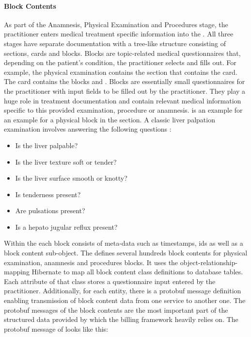 \paragraph{Block Contents}
As part of the Anamnesis, Physical Examination and Procedures stage,
the practitioner enters medical treatment specific information into the \AVS.
All three stages have separate documentation with a tree-like structure consisting of sections, cards and blocks.
Blocks are topic-related medical questionnaires that, depending on the patient's condition, the practitioner selects and fills out.
For example, the physical examination contains the section  that contains the  card.
The  card contains the blocks  and .
Blocks are essentially small questionnaires for the practitioner with input fields to be filled out by the practitioner.
They play a huge role in treatment documentation and contain relevant medical information specific to this provided examination, procedure or anamnesis.
 is an example for an example for a physical block in the  section.
A classic liver palpation examination involves answering the following questions \cite{wolf1990evaluation}:
\begin{itemize}
    \item Is the liver palpable?
    \item Is the liver texture soft or tender?
    \item Is the liver surface smooth or knotty?
    \item Is tenderness present?
    \item Are pulsations present?
    \item Is a hepato jugular reflux present?
\end{itemize}
Within the \AVS each block consists of meta-data such as timestamps, ids as well as a block content sub-object.
The \AVS defines several hundreds block contents for physical examination, anamnesis and procedures blocks.
It uses the object-relationship-mapping Hibernate to map all block content class definitions to database tables.
Each attribute of that class stores a questionnaire input entered by the practitioner.
Additionally, for each entity, there is a protobuf message definition enabling transmission of block content data from one service
to another one.
The protobuf messages of the block contents are the most important part of the structured data provided by \AV which the billing framework heavily relies on.
The protobuf message of  looks like this:



